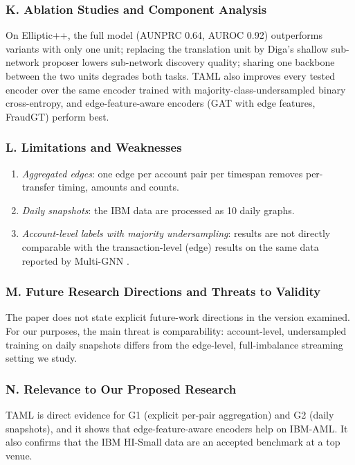 \documentclass[11pt,a4paper]{article}
\begin{document}
\subsubsection*{K. Ablation Studies and Component Analysis}
On Elliptic++, the full model (AUNPRC 0.64, AUROC 0.92) outperforms variants with only one unit; replacing the translation unit by Diga's shallow sub-network proposer lowers sub-network discovery quality; sharing one backbone between the two units degrades both tasks. TAML also improves every tested encoder over the same encoder trained with majority-class-undersampled binary cross-entropy, and edge-feature-aware encoders (GAT with edge features, FraudGT) perform best.

\subsubsection*{L. Limitations and Weaknesses}
\begin{enumerate}[leftmargin=*]
    \item \textit{Aggregated edges}: one edge per account pair per timespan removes per-transfer timing, amounts and counts.
    \item \textit{Daily snapshots}: the IBM data are processed as 10 daily graphs.
    \item \textit{Account-level labels with majority undersampling}: results are not directly comparable with the transaction-level (edge) results on the same data reported by Multi-GNN \cite{egressy2024multigraph}.
\end{enumerate}

\subsubsection*{M. Future Research Directions and Threats to Validity}
The paper does not state explicit future-work directions in the version examined. For our purposes, the main threat is comparability: account-level, undersampled training on daily snapshots differs from the edge-level, full-imbalance streaming setting we study.

\subsubsection*{N. Relevance to Our Proposed Research}
TAML is direct evidence for G1 (explicit per-pair aggregation) and G2 (daily snapshots), and it shows that edge-feature-aware encoders help on IBM-AML. It also confirms that the IBM HI-Small data are an accepted benchmark at a top venue.
\end{document}
